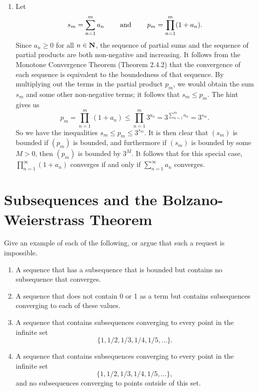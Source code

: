 \documentclass{lew98_solutions}
\begin{document}
\begin{solution}
\begin{enumerate}
        \item Let
        \[
            s_m = \sum_{n=1}^m a_n \hspace{8mm} \text{and} \hspace{8mm} p_m = \prod_{n=1}^m (1 + a_n).
        \]
        Since \( a_n \geq 0 \) for all \( n \in \mathbf{N} \), the sequence of partial sums and the sequence of partial products are both non-negative and increasing. It follows from the Monotone Convergence Theorem (Theorem 2.4.2) that the convergence of each sequence is equivalent to the boundedness of that sequence. By multiplying out the terms in the partial product \( p_m \), we would obtain the sum \( s_m \) and some other non-negative terms; it follows that \( s_m \leq p_m \). The hint gives us
        \[
            p_m = \prod_{n=1}^m (1 + a_n) \leq \prod_{n=1}^m 3^{a_n} = 3^{\sum_{n=1}^m a_n} = 3^{s_m}.
        \]
        So we have the inequalities \( s_m \leq p_m \leq 3^{s_m} \). It is then clear that \( (s_m) \) is bounded if \( (p_m) \) is bounded, and furthermore if \( (s_m) \) is bounded by some \( M > 0 \), then \( (p_m) \) is bounded by \( 3^M \). It follows that for this special case, \( \prod_{n=1}^{\infty} (1 + a_n) \) converges if and only if \( \sum_{n=1}^{\infty} a_n \) converges.
    \end{enumerate}
\end{solution}

\section{Subsequences and the Bolzano-Weierstrass Theorem}
\label{sec:2.5}

\begin{exercise}
\label{ex:2.5.1}
    Give an example of each of the following, or argue that such a request is impossible.
    \begin{enumerate}
        \item A sequence that has a subsequence that is bounded but contains no subsequence that converges.

        \item A sequence that does not contain 0 or 1 as a term but contains subsequences converging to each of these values.

        \item A sequence that contains subsequences converging to every point in the infinite set
        \[
            \{ 1, 1/2, 1/3, 1/4, 1/5, \ldots \}.
        \]

        \item A sequence that contains subsequences converging to every point in the infinite set
        \[
            \{ 1, 1/2, 1/3, 1/4, 1/5, \ldots \},
        \]
        and no subsequences converging to points outside of this set.
    \end{enumerate}
\end{exercise}
\end{document}
